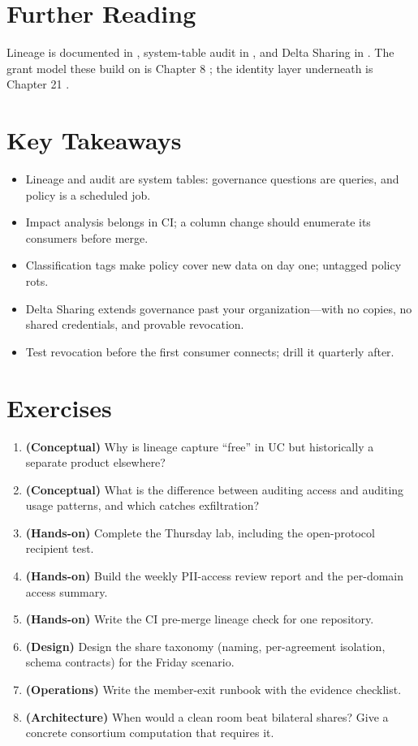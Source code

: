\section{Further Reading}
Lineage is documented in \cite{databricksLineage}, system-table audit in \cite{databricksSystemTables}, and Delta Sharing in \cite{databricksDeltaSharing}. The grant model these build on is Chapter 8 \cite{databricksUnityCatalog}; the identity layer underneath is Chapter 21 \cite{databricksSecurity}.

\section*{Key Takeaways}
\begin{itemize}
    \item Lineage and audit are system tables: governance questions are queries, and policy is a scheduled job.
    \item Impact analysis belongs in CI; a column change should enumerate its consumers before merge.
    \item Classification tags make policy cover new data on day one; untagged policy rots.
    \item Delta Sharing extends governance past your organization---with no copies, no shared credentials, and provable revocation.
    \item Test revocation before the first consumer connects; drill it quarterly after.
\end{itemize}

\section{Exercises}
\begin{enumerate}
    \item \textbf{(Conceptual)} Why is lineage capture ``free'' in UC but historically a separate product elsewhere?
    \item \textbf{(Conceptual)} What is the difference between auditing access and auditing usage patterns, and which catches exfiltration?
    \item \textbf{(Hands-on)} Complete the Thursday lab, including the open-protocol recipient test.
    \item \textbf{(Hands-on)} Build the weekly PII-access review report and the per-domain access summary.
    \item \textbf{(Hands-on)} Write the CI pre-merge lineage check for one repository.
    \item \textbf{(Design)} Design the share taxonomy (naming, per-agreement isolation, schema contracts) for the Friday scenario.
    \item \textbf{(Operations)} Write the member-exit runbook with the evidence checklist.
    \item \textbf{(Architecture)} When would a clean room beat bilateral shares? Give a concrete consortium computation that requires it.
\end{enumerate}
